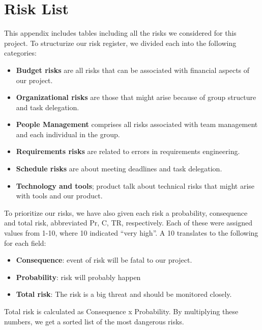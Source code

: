 \chapter{Risk List}\label{appendix:risk_list}

This appendix includes tables including all the risks we considered for this project.
To structurize our risk register, we divided each into the following
categories:
\begin{itemize}
    \item \textbf{Budget risks} are all risks that can be associated with
        financial aspects of our project.
    \item \textbf{Organizational risks} are those that might arise because of
    group structure and task delegation.
    \item \textbf{People Management} comprises all risks associated with team
        management and each individual in the group.
    \item \textbf{Requirements risks} are related to errors in requirements
        engineering.
    \item \textbf{Schedule risks} are about meeting deadlines and task
        delegation.
    \item \textbf{Technology and tools}; product talk about technical risks that
        might arise with tools and our product.
\end{itemize}

To prioritize our risks, we have also given each risk a probability,
consequence and total risk, abbreviated Pr, C, TR, respectively. Each
of these were assigned values from 1-10, where 10 indicated
``very high''. A 10 translates to
the following for each field:
\begin{itemize}
    \item \textbf{Consequence}: event of risk will be fatal to our project.
    \item \textbf{Probability}: risk will probably happen
    \item \textbf{Total risk}: The risk is a big threat and should be monitored closely.
\end{itemize}

Total risk is calculated as Consequence x Probability. By multiplying
these numbers, we get a sorted list of the most dangerous risks. 


